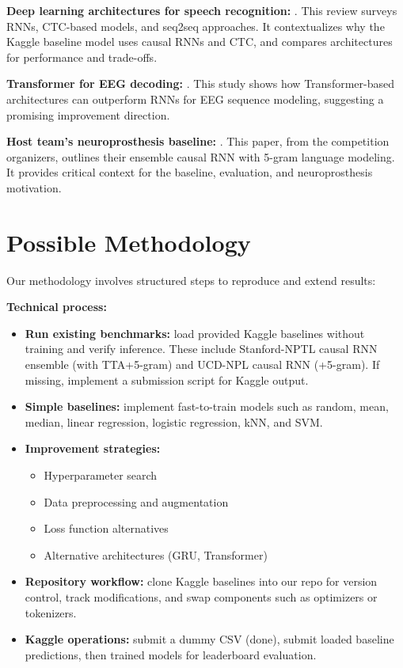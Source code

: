 \documentclass[10pt,twocolumn,letterpaper]{article}
\begin{document}
\textbf{Deep learning architectures for speech recognition:} \cite{papastratis_speech_2021}.  
This review surveys RNNs, CTC-based models, and seq2seq approaches. It contextualizes why the Kaggle baseline model uses causal RNNs and CTC, and compares architectures for performance and trade-offs.

\textbf{Transformer for EEG decoding:} \cite{lee_eeg-transformer_2021}.  
This study shows how Transformer-based architectures can outperform RNNs for EEG sequence modeling, suggesting a promising improvement direction.

\textbf{Host team’s neuroprosthesis baseline:} \cite{card_accurate_2024}.  
This paper, from the competition organizers, outlines their ensemble causal RNN with 5-gram language modeling. It provides critical context for the baseline, evaluation, and neuroprosthesis motivation.

\section{Possible Methodology}
Our methodology involves structured steps to reproduce and extend results:

\textbf{Technical process:}
\begin{itemize}
    \item \textbf{Run existing benchmarks:} load provided Kaggle baselines without training and verify inference. These include Stanford-NPTL causal RNN ensemble (with TTA+5-gram) and UCD-NPL causal RNN (+5-gram). If missing, implement a submission script for Kaggle output.
    \item \textbf{Simple baselines:} implement fast-to-train models such as random, mean, median, linear regression, logistic regression, kNN, and SVM.
    \item \textbf{Improvement strategies:} 
    \begin{itemize}
        \item Hyperparameter search
        \item Data preprocessing and augmentation
        \item Loss function alternatives
        \item Alternative architectures (GRU, Transformer)
    \end{itemize}
    \item \textbf{Repository workflow:} clone Kaggle baselines into our repo for version control, track modifications, and swap components such as optimizers or tokenizers.
    \item \textbf{Kaggle operations:} submit a dummy CSV (done), submit loaded baseline predictions, then trained models for leaderboard evaluation.
\end{itemize}
\end{document}
